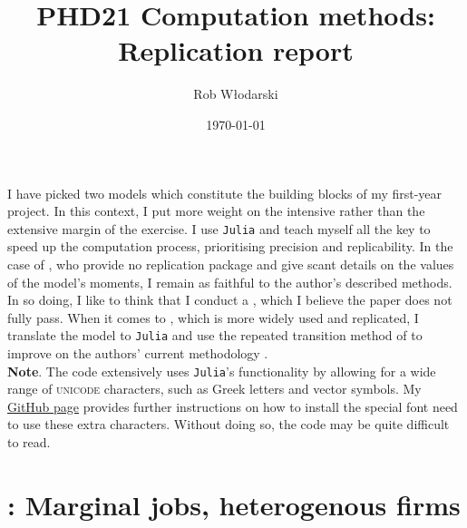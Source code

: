 \documentclass[12pt, leqno]{article}
\begin{document}
\title{\Large \bfseries \vspace{-5mm} PHD21 Computation methods: Replication report \vspace{-5mm}}
\author{Rob Włodarski}
\date{\today}
\maketitle

I have picked two models which constitute the building blocks of my first-year project.    
In this context, I put more weight on the intensive rather than the extensive margin of the exercise. 
I use \texttt{Julia} and teach myself all the key  to speed up the computation process, prioritising precision and replicability. 
In the case of \citet{buera_anatomy_2015}, who provide no replication package and give scant details on the values of the model's moments, I remain as faithful to the author's described methods.
In so doing, I like to think that I conduct a , which I believe the paper does not fully pass.
When it comes to \citet{elsby_marginal_2013}, which is more widely used and replicated, I translate the model to \texttt{Julia} and use the repeated transition method of \citet{lee_global_2025} to improve on the authors' current methodology \citep{krusell_income_1998}.\\

\textbf{Note}. The code extensively uses \texttt{Julia}'s functionality by allowing for a wide range of \textsc{unicode} characters, such as Greek letters and vector symbols.
My \href{https://github.com/robertwlodarski/phd21_computational_methods/tree/main}{GitHub page} provides further instructions on how to install the special font need to use these extra characters. 
Without doing so, the code may be quite difficult to read. 

\section{\citet{elsby_marginal_2013}: Marginal jobs, heterogenous firms}
\end{document}
